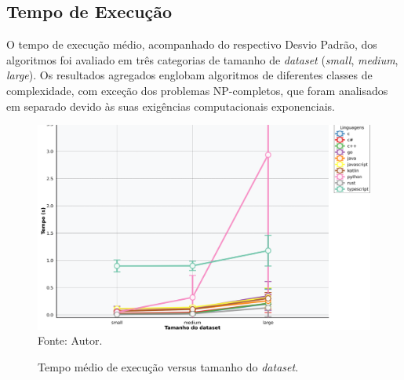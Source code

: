 \documentclass[12pt,a4paper]{article}
\newcommand{\eng}[1]{\textit{#1}}
\begin{document}
\subsection{Tempo de Execução}

O tempo de execução médio, acompanhado do respectivo Desvio Padrão, dos algoritmos foi avaliado em três categorias de tamanho de \eng{dataset} (\eng{small}, \eng{medium}, \eng{large}). Os resultados agregados englobam algoritmos de diferentes classes de complexidade, com exceção dos problemas NP-completos, que foram analisados em separado devido às suas exigências computacionais exponenciais.

\begin{figure}[H]
\caption{Tempo médio de execução versus tamanho do \eng{dataset}.}
\centering
\includegraphics[width=\textwidth]{img/tempo_vs_tamanho.png}
\label{fig:tempo_execucao}
\centering
\small Fonte: Autor.
\end{figure}
\end{document}
